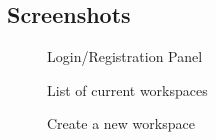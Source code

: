 \newpage

\subsection{Screenshots}

\begin{figure}[h]
    \centering
    \caption{Login/Registration Panel}
    \label{fig:login}
\end{figure}

\begin{figure}[!h]
    \centering
    \caption{List of current workspaces}
    \label{fig:workspaces-list}
\end{figure}

\begin{figure}[h]
    \centering
    \caption{Create a new workspace}
    \label{fig:create-workspace}
\end{figure}

